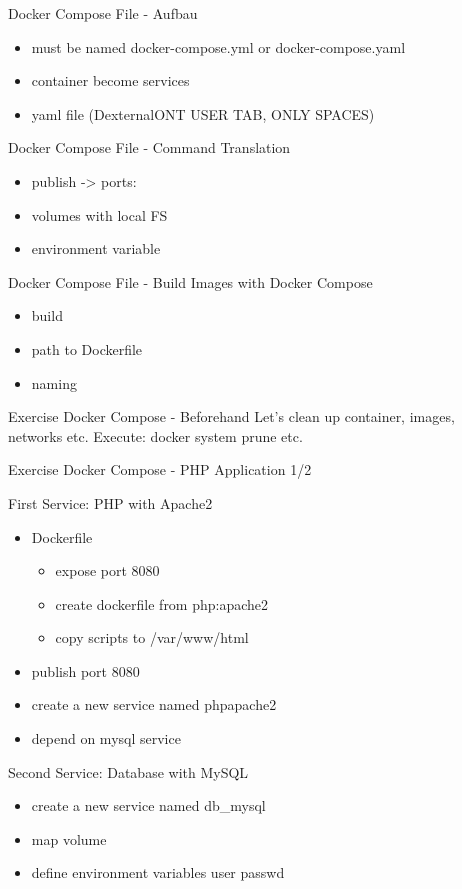 \documentclass[10pt,aspectratio=\ratio,
compress
]{beamer}
\begin{document}
\begin{frame}{Docker Compose File - Aufbau}

\begin{itemize}
	\item must be named docker-compose.yml or docker-compose.yaml
	\item container become services
	\item yaml file (DexternalONT USER TAB, ONLY SPACES)
\end{itemize}
\end{frame}

\begin{frame}{Docker Compose File - Command Translation}

\begin{itemize}
	\item publish -> ports:
	\item volumes with local FS
	\item environment variable
\end{itemize}
\end{frame}

\begin{frame}{Docker Compose File - Build Images with Docker Compose}

\begin{itemize}
	\item build
	\item path to Dockerfile
	\item naming
\end{itemize}
\end{frame}



\begin{frame}{Exercise Docker Compose - Beforehand}
Let's clean up container, images, networks etc.
Execute: docker system prune etc.
\end{frame}

\begin{frame}{Exercise Docker Compose - PHP Application 1/2}


First Service: PHP with Apache2
\begin{itemize}
	\item Dockerfile
	\begin{itemize}
			\item expose port 8080
			\item create dockerfile from php:apache2
			\item copy scripts to /var/www/html
	\end{itemize}
	\item publish port 8080
	\item create a new service named phpapache2
	\item depend on mysql service
\end{itemize}
Second Service: Database with MySQL
\begin{itemize}
	\item create a new service named db\_mysql
	\item map volume
	\item define environment variables user passwd
\end{itemize}

\end{frame}
\end{document}
